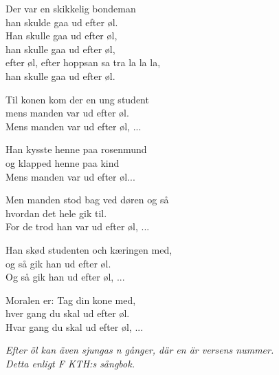 \vspace{10pt}
\revrpt Der var en skikkelig bondeman\\
han skulde gaa ud efter øl.\rpt\\
Han skulle gaa ud efter øl,\\
han skulle gaa ud efter øl,\\
efter øl, efter hoppsan sa tra la la la,\\
han skulle gaa ud efter øl.\par
\vspace{10pt}
\revrpt Til konen kom der en ung student\\
mens manden var ud efter øl.\rpt\\
Mens manden var ud efter øl, ...\par
\vspace{10pt}
\revrpt Han kysste henne paa rosenmund\\
og klapped henne paa kind\rpt\\
Mens manden var ud efter øl...\par
\vspace{10pt}
\revrpt Men manden stod bag ved døren og så\\
hvordan det hele gik til.\rpt\\
For de trod han var ud efter øl, ...\par
\vspace{10pt}
\revrpt Han skød studenten och kæringen med,\\
og så gik han ud efter øl.\rpt\\
Og så gik han ud efter øl, ...\par
\vspace{10pt}
\revrpt Moralen er: Tag din kone med,\\
hver gang du skal ud efter øl.\rpt\\
Hvar gang du skal ud efter øl, ...\par
\vspace{10pt}
{\footnotesize\textit{Efter öl kan även sjungas n gånger, där en är versens nummer.\\
Detta enligt F KTH:s sångbok.}}
